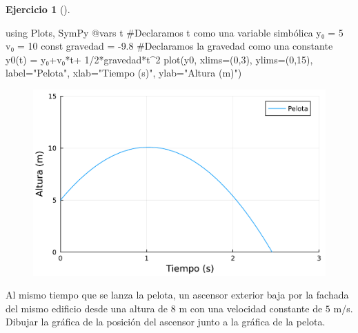 \documentclass[
  a4paper,
]{scrreport}
\newenvironment{Shaded}{\begin{snugshade}}{\end{snugshade}}
\newcommand{\BuiltInTok}[1]{\textcolor[rgb]{0.00,0.23,0.31}{#1}}
\newcommand{\CommentTok}[1]{\textcolor[rgb]{0.37,0.37,0.37}{#1}}
\newcommand{\FloatTok}[1]{\textcolor[rgb]{0.68,0.00,0.00}{#1}}
\newcommand{\FunctionTok}[1]{\textcolor[rgb]{0.28,0.35,0.67}{#1}}
\newcommand{\ImportTok}[1]{\textcolor[rgb]{0.00,0.46,0.62}{#1}}
\newcommand{\KeywordTok}[1]{\textcolor[rgb]{0.00,0.23,0.31}{#1}}
\newcommand{\NormalTok}[1]{\textcolor[rgb]{0.00,0.23,0.31}{#1}}
\newcommand{\OperatorTok}[1]{\textcolor[rgb]{0.37,0.37,0.37}{#1}}
\newcommand{\PreprocessorTok}[1]{\textcolor[rgb]{0.68,0.00,0.00}{#1}}
\newcommand{\StringTok}[1]{\textcolor[rgb]{0.13,0.47,0.30}{#1}}
\theoremstyle{definition}
\newtheorem{exercise}{Ejercicio}[chapter]
\theoremstyle{remark}
\begin{document}
\begin{exercise}[]
\begin{tcolorbox}
\begin{Shaded}
\begin{Highlighting}[]
\ImportTok{using} \BuiltInTok{Plots}\NormalTok{, }\BuiltInTok{SymPy}
\PreprocessorTok{@vars}\NormalTok{ t  }\CommentTok{\#Declaramos t como una variable simbólica}
\NormalTok{y₀ }\OperatorTok{=} \FloatTok{5}
\NormalTok{v₀ }\OperatorTok{=} \FloatTok{10}
\KeywordTok{const}\NormalTok{ gravedad }\OperatorTok{=} \OperatorTok{{-}}\FloatTok{9.8}  \CommentTok{\#Declaramos la gravedad como una constante}
\FunctionTok{y0}\NormalTok{(t) }\OperatorTok{=}\NormalTok{ y₀}\OperatorTok{+}\NormalTok{v₀}\OperatorTok{*}\NormalTok{t}\OperatorTok{+} \FloatTok{1}\OperatorTok{/}\FloatTok{2}\OperatorTok{*}\NormalTok{gravedad}\OperatorTok{*}\NormalTok{t}\OperatorTok{\^{}}\FloatTok{2}
\FunctionTok{plot}\NormalTok{(y0, xlims}\OperatorTok{=}\NormalTok{(}\FloatTok{0}\NormalTok{,}\FloatTok{3}\NormalTok{), ylims}\OperatorTok{=}\NormalTok{(}\FloatTok{0}\NormalTok{,}\FloatTok{15}\NormalTok{), label}\OperatorTok{=}\StringTok{"Pelota"}\NormalTok{, xlab}\OperatorTok{=}\StringTok{"Tiempo (s)"}\NormalTok{, ylab}\OperatorTok{=}\StringTok{"Altura (m)"}\NormalTok{)}
\end{Highlighting}
\end{Shaded}

\begin{figure}[H]

{\centering \includegraphics{./funciones-elementales_files/figure-pdf/cell-5-output-1.pdf}

}

\end{figure}

\end{tcolorbox}

Al mismo tiempo que se lanza la pelota, un ascensor exterior baja por la
fachada del mismo edificio desde una altura de \(8\) m con una velocidad
constante de \(5\) m/s. Dibujar la gráfica de la posición del ascensor
junto a la gráfica de la pelota.


\end{exercise}
\end{document}
